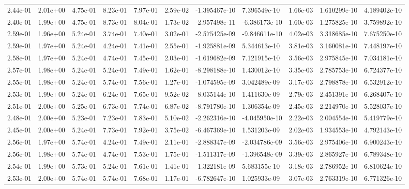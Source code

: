 \begin{longtable}{| p{} | p{} |}
2.44e-01 & 2.01e+00 & 4.75e-01 & 8.23e-01 & 7.97e-01 & 2.59e-02 & -1.395467e-10 &  7.396549e-10 &  1.66e-03 &  1.610299e-10 &  4.189402e-10 \\
2.40e-01 & 1.99e+00 & 4.75e-01 & 8.73e-01 & 8.04e-01 & 1.73e-02 & -2.957498e-11 & -6.386173e-10 &  1.60e-03 &  1.275825e-10 &  3.759892e-10 \\
2.59e-01 & 1.96e+00 & 5.24e-01 & 3.74e-01 & 7.40e-01 & 3.02e-01 & -2.575425e-09 & -9.846611e-10 &  4.02e-03 &  3.318685e-10 &  7.675250e-10 \\
2.59e-01 & 1.97e+00 & 5.24e-01 & 4.24e-01 & 7.41e-01 & 2.55e-01 & -1.925881e-09 &  5.344613e-10 &  3.81e-03 &  3.160081e-10 &  7.448197e-10 \\
2.58e-01 & 1.97e+00 & 5.24e-01 & 4.74e-01 & 7.45e-01 & 2.03e-01 & -1.619682e-09 &  7.121915e-10 &  3.56e-03 &  2.975845e-10 &  7.034181e-10 \\
2.57e-01 & 1.98e+00 & 5.24e-01 & 5.24e-01 & 7.49e-01 & 1.62e-01 & -8.298188e-10 &  1.430012e-10 &  3.35e-03 &  2.785753e-10 &  6.724377e-10 \\
2.55e-01 & 1.98e+00 & 5.24e-01 & 5.74e-01 & 7.56e-01 & 1.27e-01 & -1.074595e-09 &  3.042489e-09 &  3.17e-03 &  2.798878e-10 &  6.532912e-10 \\
2.53e-01 & 1.99e+00 & 5.24e-01 & 6.24e-01 & 7.65e-01 & 9.52e-02 & -8.035144e-10 &  1.411630e-09 &  2.79e-03 &  2.451391e-10 &  6.268407e-10 \\
2.51e-01 & 2.00e+00 & 5.25e-01 & 6.73e-01 & 7.74e-01 & 6.87e-02 & -8.791780e-10 &  1.306354e-09 &  2.45e-03 &  2.214970e-10 &  5.528037e-10 \\
2.48e-01 & 2.00e+00 & 5.23e-01 & 7.23e-01 & 7.83e-01 & 5.10e-02 & -2.262316e-10 & -4.045950e-10 &  2.22e-03 &  2.004554e-10 &  5.419779e-10 \\
2.45e-01 & 2.00e+00 & 5.24e-01 & 7.73e-01 & 7.92e-01 & 3.75e-02 & -6.467369e-10 &  1.531203e-09 &  2.02e-03 &  1.934553e-10 &  4.792143e-10 \\
2.56e-01 & 1.97e+00 & 5.74e-01 & 4.24e-01 & 7.49e-01 & 2.11e-01 & -2.888347e-09 & -2.034786e-09 &  3.56e-03 &  2.975406e-10 &  6.900243e-10 \\
2.56e-01 & 1.98e+00 & 5.74e-01 & 4.74e-01 & 7.53e-01 & 1.75e-01 & -1.511317e-09 & -1.396548e-09 &  3.39e-03 &  2.865927e-10 &  6.789348e-10 \\
2.54e-01 & 1.99e+00 & 5.73e-01 & 5.24e-01 & 7.61e-01 & 1.41e-01 & -1.322181e-09 &  5.683155e-10 &  3.18e-03 &  2.786952e-10 &  6.810624e-10 \\
2.53e-01 & 2.00e+00 & 5.74e-01 & 5.74e-01 & 7.68e-01 & 1.17e-01 & -6.782647e-10 &  1.025933e-09 &  3.07e-03 &  2.763319e-10 &  6.771326e-10 \\

\end{longtable}
